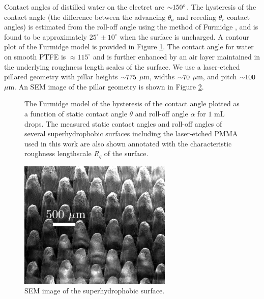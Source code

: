 \documentclass[12pt,a4paper,oneside]{book}
\begin{document}
Contact angles of distilled water on the electret are $\sim \hspace{-1mm} 150^{\circ}$. The hysteresis of the contact angle (the difference between the advancing $\theta_a$ and receding $\theta_r$ contact angles) is estimated from the roll-off angle using the method of Furmidge \cite{furmidge_studies_1962}, and is found to be approximately $25^{\circ} \pm 10^{\circ}$ when the surface is uncharged. A contour plot of the Furmidge model is provided in Figure \ref{fig:hysteresis}. The contact angle for water on smooth PTFE is $\approx 115^{\circ}$ and is further enhanced by an air layer maintained in the underlying roughness length scales of the surface. We use a laser-etched pillared geometry with pillar heights $\sim \hspace{-1mm} 775$ $\mu$m, widths $\sim \hspace{-1mm} 70$ $\mu$m, and pitch $\sim \hspace{-1mm} 100$ $\mu$m. An SEM image of the pillar geometry is shown in Figure \ref{fig:SEM}.
\begin{figure}
    \centering
    
       \caption{The Furmidge model of the hysteresis of the contact angle plotted as a function of static contact angle $\theta$ and roll-off angle $\alpha$ for $1$ mL drops. The measured static contact angles and roll-off angles of several superhydrophobic surfaces including the laser-etched PMMA used in this work are also shown annotated with the characteristic roughness lengthscale $R_q$ of the surface.\label{fig:hysteresis}}
\end{figure}

\begin{figure}
 \centering
 \includegraphics[width=0.65\textwidth]{../figures/SEM.pdf}
 \caption{SEM image of the superhydrophobic surface.\label{fig:SEM}}
\end{figure}
\end{document}
